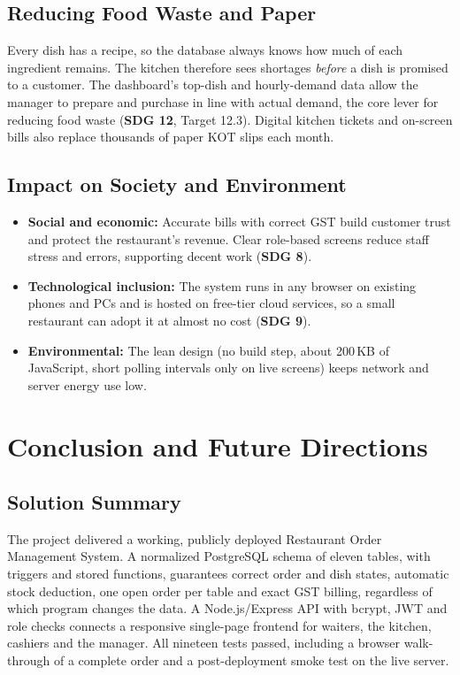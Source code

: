 \documentclass[11pt,a4paper]{report}
\begin{document}
\subsection{Reducing Food Waste and Paper}
Every dish has a recipe, so the database always knows how much of each ingredient remains. The kitchen therefore sees shortages \emph{before} a dish is promised to a customer. The dashboard's top-dish and hourly-demand data allow the manager to prepare and purchase in line with actual demand, the core lever for reducing food waste (\textbf{SDG 12}, Target 12.3). Digital kitchen tickets and on-screen bills also replace thousands of paper KOT slips each month.

\subsection{Impact on Society and Environment}
\begin{itemize}
    \item \textbf{Social and economic:} Accurate bills with correct GST build customer trust and protect the restaurant's revenue. Clear role-based screens reduce staff stress and errors, supporting decent work (\textbf{SDG 8}).
    \item \textbf{Technological inclusion:} The system runs in any browser on existing phones and PCs and is hosted on free-tier cloud services, so a small restaurant can adopt it at almost no cost (\textbf{SDG 9}).
    \item \textbf{Environmental:} The lean design (no build step, about 200\,KB of JavaScript, short polling intervals only on live screens) keeps network and server energy use low.
\end{itemize}


\section{Conclusion and Future Directions}

\subsection{Solution Summary}
The project delivered a working, publicly deployed Restaurant Order Management System. A normalized PostgreSQL schema of eleven tables, with triggers and stored functions, guarantees correct order and dish states, automatic stock deduction, one open order per table and exact GST billing, regardless of which program changes the data. A Node.js/Express API with bcrypt, JWT and role checks connects a responsive single-page frontend for waiters, the kitchen, cashiers and the manager. All nineteen tests passed, including a browser walk-through of a complete order and a post-deployment smoke test on the live server.
\end{document}
